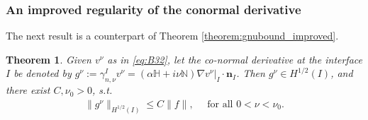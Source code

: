 \documentclass[report]{elsarticle}
\newtheorem{theorem}{Theorem}[section]
\numberwithin{theorem}{section}
\renewcommand{\vec}[1]{\mathbf{#1}}
\begin{document}
\subsubsection{An improved regularity of the conormal derivative}
The next result is a counterpart of Theorem \ref{theorem:gnubound_improved}.
\begin{theorem}
	\label{theorem:gnubound_improved_general}
	Given $v^{\nu}$ as in \eqref{eq:B32}, let the co-normal derivative at the interface $I$ be denoted by $g^{\nu}:=\gamma_{n, \nu}^{I}v^{\nu}=\left.( \alpha \mathbb{H}+i\nu\mathbb{N})\nabla v^{\nu}\right|_{I}\cdot \vec{n}_I$. Then $g^{\nu}\in {H}^{1/2}(I)$, and there exist $C, \nu_0>0$, s.t. 
	\begin{align}
		\label{eq:gnubound_key_general}
		\|g^{\nu}\|_{{H}^{1/2}(I)}\leq C\|f\|, \quad \text{ for all }0<\nu<\nu_0.
	\end{align}
\end{theorem}
\end{document}

